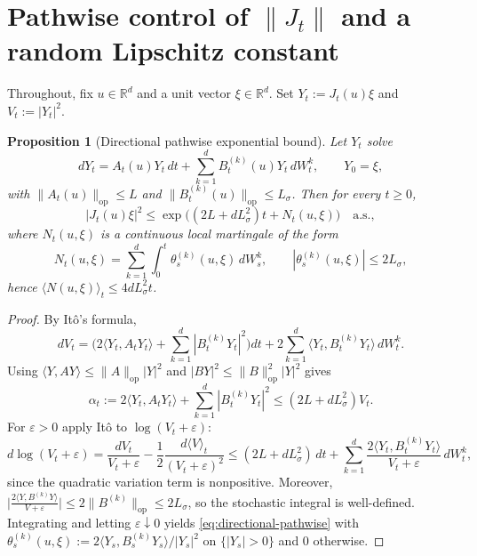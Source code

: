 \documentclass{tsp-short}
\newtheorem{proposition}{Proposition}[section]
\theoremstyle{remark}
\theoremstyle{definition}
\begin{document}
\section{Pathwise control of $\|J_t\|$ and a random Lipschitz constant}\label{subsec:jacobian-constant}

Throughout, fix $u\in\mathbb{R}^d$ and a unit vector $\xi\in\mathbb{R}^d$.
Set $Y_t:=J_t(u)\xi$ and $V_t:=|Y_t|^2$.

\begin{proposition}[Directional pathwise exponential bound]\label{prop:directional-exp-bound}
Let $Y_t$ solve
\begin{equation*}
dY_t = A_t(u)Y_t\,dt + \sum_{k=1}^d B_t^{(k)}(u)Y_t\,dW_t^k,
\qquad Y_0=\xi,
\end{equation*}
with $\|A_t(u)\|_{\mathrm{op}}\le L$ and $\|B_t^{(k)}(u)\|_{\mathrm{op}}\le L_\sigma$.
Then for every $t\ge0$,
\begin{equation}\label{eq:directional-pathwise}
|J_t(u)\xi|^2 \le \exp\Big((2L+dL_\sigma^2)t + N_t(u,\xi)\Big)\quad\text{a.s.},
\end{equation}
where $N_t(u,\xi)$ is a continuous local martingale of the form
\begin{equation*}
N_t(u,\xi)=\sum_{k=1}^d\int_0^t \theta_s^{(k)}(u,\xi)\,dW_s^k,
\qquad |\theta_s^{(k)}(u,\xi)|\le 2L_\sigma,
\end{equation*}
hence $\langle N(u,\xi)\rangle_t\le 4dL_\sigma^2 t$.
\end{proposition}

\begin{proof}
By It\^o's formula,
\begin{equation*}
dV_t
=\Big(2\langle Y_t,A_tY_t\rangle+\sum_{k=1}^d|B_t^{(k)}Y_t|^2\Big)dt
+2\sum_{k=1}^d\langle Y_t,B_t^{(k)}Y_t\rangle\,dW_t^k.
\end{equation*}
Using $\langle Y,AY\rangle\le \|A\|_{\mathrm{op}}|Y|^2$ and $|BY|^2\le \|B\|_{\mathrm{op}}^2|Y|^2$ gives
\begin{equation*}
\alpha_t:=2\langle Y_t,A_tY_t\rangle+\sum_{k=1}^d|B_t^{(k)}Y_t|^2 \le (2L+dL_\sigma^2)V_t.
\end{equation*}
For $\varepsilon>0$ apply It\^o to $\log(V_t+\varepsilon)$:
\begin{equation*}
d\log(V_t+\varepsilon)=\frac{dV_t}{V_t+\varepsilon}
-\frac{1}{2}\frac{d\langle V\rangle_t}{(V_t+\varepsilon)^2}
\le (2L+dL_\sigma^2)\,dt+\sum_{k=1}^d\frac{2\langle Y_t,B_t^{(k)}Y_t\rangle}{V_t+\varepsilon}\,dW_t^k,
\end{equation*}
since the quadratic variation term is nonpositive.
Moreover,
$\big|\frac{2\langle Y,B^{(k)}Y\rangle}{V+\varepsilon}\big|\le 2\|B^{(k)}\|_{\mathrm{op}}\le 2L_\sigma$,
so the stochastic integral is well-defined.
Integrating and letting $\varepsilon\downarrow0$ yields \eqref{eq:directional-pathwise} with
$\theta_s^{(k)}(u,\xi):= 2\langle Y_s,B_s^{(k)}Y_s\rangle/|Y_s|^2$ on $\{|Y_s|>0\}$ and $0$ otherwise.
\end{proof}
\end{document}
